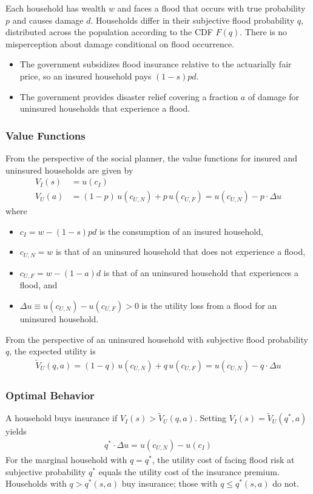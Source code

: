 \documentclass[12pt]{article}
\begin{document}
Each household has wealth $w$ and faces a flood that occurs with true probability $p$ and causes damage $d$. Households differ in their subjective flood probability $q$, distributed across the population according to the CDF $F(q)$. There is no misperception about damage conditional on flood occurrence.

\begin{itemize}
    \item The government subsidizes flood insurance relative to the actuarially fair price, so an insured household pays $(1-s)pd$.
    \item The government provides disaster relief covering a fraction $a$ of damage for uninsured households that experience a flood.
\end{itemize}

\subsubsection*{Value Functions}

From the perspective of the social planner, the value functions for insured and uninsured households are given by
\begin{align}
    V_I(s) &= u(c_I) \\
    V_U(a) &= (1-p)\,u(c_{U,N}) + p\,u(c_{U,F}) = u(c_{U,N}) - p\cdot \Delta u
\end{align}
where 
\begin{itemize}
    \item $c_I = w - (1-s)pd$ is the consumption of an insured household,
    \item $c_{U,N} = w$ is that of an uninsured household that does not experience a flood,
    \item $c_{U,F} = w - (1-a)d$ is that of an uninsured household that experiences a flood, and
    \item $\Delta u \equiv u(c_{U,N}) - u(c_{U,F}) > 0$ is the utility loss from a flood for an uninsured household.
\end{itemize}
From the perspective of an uninsured household with subjective flood probability $q$, the expected utility is
\begin{align}
    \tilde{V}_U(q,a) = (1-q)\,u(c_{U,N}) + q\,u(c_{U,F}) = u(c_{U,N}) - q\cdot \Delta u
\end{align}

\subsubsection*{Optimal Behavior}
A household buys insurance if $V_I(s) > \tilde{V}_U(q,a)$. Setting $V_I(s) = \tilde{V}_U(q^*,a)$ yields
\begin{align}
    q^*\cdot\Delta u = u(c_{U,N}) - u(c_I) \label{eq:qstar}
\end{align}
For the marginal household with $q = q^*$, the utility cost of facing flood risk at subjective probability $q^*$ equals the utility cost of the insurance premium. 
Households with $q > q^*(s,a)$ buy insurance; those with $q \leq q^*(s,a)$ do not.
\end{document}
